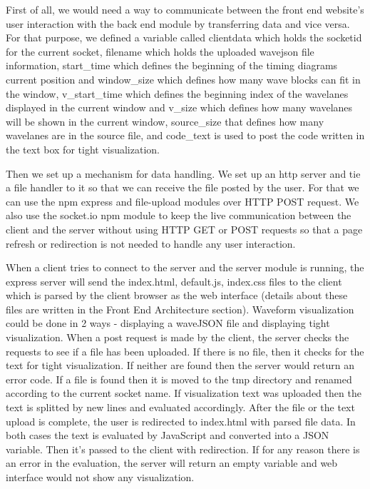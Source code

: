 \documentclass[14pt]{extarticle}
\begin{document}
 First of all, we would need a way to communicate between the front end website’s user interaction with the back end module by transferring data and vice versa. For that purpose, we defined a variable called clientdata which holds the socketid for the current socket, filename which holds the uploaded wavejson file information, start\_time which defines the beginning of the timing diagrams current position and window\_size which defines how many wave blocks can fit in the window, v\_start\_time which defines the beginning index of the wavelanes displayed in the current window and v\_size which defines how many wavelanes will be shown in the current window, source\_size that defines how many wavelanes are in the source file, and code\_text is used to post the code written in the text box for tight visualization.
 \par Then we set up a mechanism for data handling. We set up an http server and tie a file handler to it so that we can receive the file posted by the user. For that we can use the npm express and file-upload modules over HTTP POST request. We also use the socket.io npm module to keep the live communication between the client and the server without using HTTP GET or POST requests so that a page refresh or redirection is not needed to handle any user interaction.
 \par When a client tries to connect to the server and the server module is running, the express server will send the index.html, default.js, index.css files to the client which is parsed by the client browser as the web interface (details about these files are written in the Front End Architecture section). Waveform visualization could be done in 2 ways - displaying a waveJSON file and displaying tight visualization. When a post request is made by the client, the server checks the requests to see if a file has been uploaded. If there is no file, then it checks for the text for tight visualization. If neither are found then the server would return an error code. If a file is found then it is moved to the tmp directory and renamed according to the current socket name. If visualization text was uploaded then  the text is splitted by new lines and evaluated accordingly. After the file or the text upload is complete, the user is redirected to index.html with parsed file data. In both cases the text is evaluated by JavaScript and converted into a JSON variable. Then it’s passed to the client with redirection. If for any reason there is an error in the evaluation, the server will return an empty variable and web interface would not show any visualization.
\end{document}
